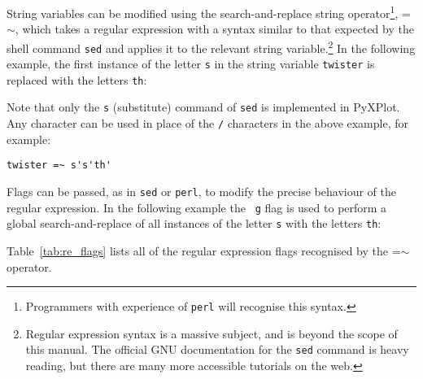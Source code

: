 String variables can be modified using the search-and-replace string
operator\footnote{Programmers with
experience of {\tt perl} will recognise this syntax.}, =$\sim$, which takes a regular expression with a syntax similar to that
expected by the shell command {\tt sed} and applies it to the relevant string variable.\footnote{Regular
expression syntax is a massive subject, and is beyond the scope of this manual.
The official GNU documentation for the {\tt sed} command is heavy reading, but
there are many more accessible tutorials on the web.} In the following example, the first instance of the letter {\tt s} in
the string variable {\tt twister} is replaced with the letters {\tt th}:

\vspace{3mm}

\vspace{3mm}

Note that only the {\tt s} (substitute) command of {\tt sed} is implemented in
PyXPlot. Any character can be used in place of the {\tt /} characters in the
above example, for example:

\begin{verbatim}
twister =~ s's'th'
\end{verbatim}

\noindent Flags can be passed, as in {\tt sed} or {\tt perl}, to modify the
precise behaviour of the regular expression. In the following example the {\tt
g} flag is used to perform a global search-and-replace of all instances of the
letter {\tt s} with the letters {\tt th}:

\vspace{3mm}

\vspace{3mm}

\noindent Table~\ref{tab:re_flags} lists all of the regular expression flags
recognised by the =$\sim$ operator.


